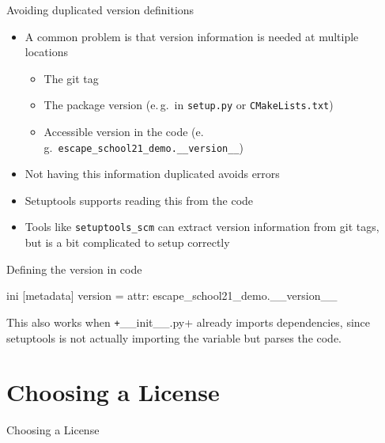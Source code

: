 \documentclass[
  aspectratio=1610,
]{beamer}
\newcommand\headlineframe[1]{%
  \begin{frame}[c]%
    \begin{center}%
      \Huge\color{vertexDarkRed}#1%
    \end{center}%
  \end{frame}%
}%
\begin{document}
\begin{frame}[fragile, c]{Avoiding duplicated version definitions}
  \begin{itemize}
    \item A common problem is that version information is needed at multiple locations
      \begin{itemize}
        \item The git tag
        \item The package version (e.\,g.\ in \texttt{setup.py} or \texttt{CMakeLists.txt})
        \item Accessible version in the code (e.\,g.\ \texttt{escape_school21_demo.__version__})
      \end{itemize}
    \item Not having this information duplicated avoids errors
    \item Setuptools supports reading this from the code
    \item Tools like \texttt{setuptools\_scm} can extract version information from git tags, \\
      but is a bit complicated to setup correctly
  \end{itemize}
\end{frame}

\begin{frame}[fragile, c]{Defining the version in code}

  \begin{code}[title=setup.cfg]{ini}
    [metadata]
    version = attr: escape_school21_demo.__version__
  \end{code}

  This also works when \texttt+__init__.py+ already imports dependencies,
  since setuptools is not actually importing the variable but parses the code.
\end{frame}

\section{Choosing a License}
\headlineframe{Choosing a License}
\end{document}
